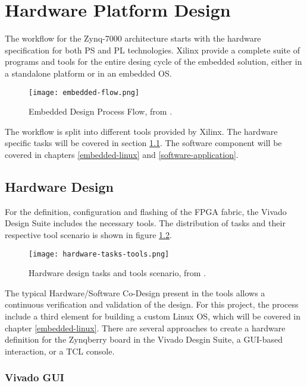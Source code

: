 
\chapter{Hardware Platform Design}

The workflow for the Zynq-7000 architecture starts with the hardware specification for both PS and PL technologies. Xilinx provide a complete suite of programs and tools for the entire desing cycle of the embedded solution, either in a standalone platform or in an embedded OS.

\begin{figure}[htp]
	\centering
	\texttt{[image: embedded-flow.png]}
	\caption{Embedded Design Process Flow, from \cite{UG1043}.} \label{fig:embedded-flow}
\end{figure}%

The workflow is split into different tools provided by Xilinx. The hardware specific tasks will be covered in section \ref{hardware-design}. The software component will be covered in chapters \ref{embedded-linux} and \ref{software-application}.

\section{Hardware Design} \label{hardware-design}

For the definition, configuration and flashing of the FPGA fabric, the Vivado Design Suite includes the necessary tools. The distribution of tasks and their respective tool scenario is shown in figure \ref{fig:hardware-tasks-tools}.

\begin{figure}[htp]
	\centering
	\texttt{[image: hardware-tasks-tools.png]}
	\caption{Hardware design tasks and tools scenario, from \cite{UG1043}.} \label{fig:hardware-tasks-tools}
\end{figure}%

The typical Hardware/Software Co-Design present in the tools allows a continuous verification and validation of the design. For this project, the process include a third element for building a custom Linux OS, which will be covered in chapter \ref{embedded-linux}. There are several approaches to create a hardware definition for the Zynqberry board in the Vivado Desgin Suite, a GUI-based interaction, or a TCL console.

\subsection{Vivado GUI}

